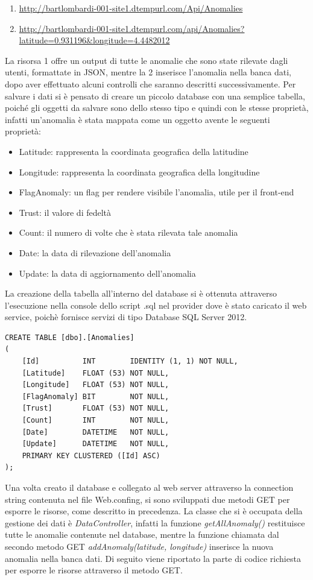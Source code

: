 \documentclass[a4paper, 11pt]{article} %
\begin{document}
\begin{enumerate}
	\item \url{http://bartlombardi-001-site1.dtempurl.com/Api/Anomalies}
	\item \url{http://bartlombardi-001-site1.dtempurl.com/api/Anomalies?latitude=0.931196\&longitude=4.4482012}
\end{enumerate}
La risorsa 1 offre un output di tutte le anomalie che sono state rilevate dagli utenti, formattate in JSON, mentre la 2 inserisce l'anomalia nella banca dati, dopo aver effettuato alcuni controlli che saranno descritti successivamente. Per salvare i dati si è pensato di creare un piccolo database con una semplice tabella, poiché gli oggetti da salvare sono dello stesso tipo e quindi con le stesse proprietà, infatti un’anomalia è stata mappata come un oggetto avente le seguenti proprietà:
\begin{itemize}
	\item Latitude: rappresenta la coordinata geografica della latitudine
	\item Longitude: rappresenta la coordinata geografica della longitudine
	\item FlagAnomaly: un flag per rendere visibile l'anomalia, utile per il front-end
	\item Trust: il valore di fedeltà
	\item Count: il numero di volte che è stata rilevata tale anomalia
	\item Date: la data di rilevazione dell'anomalia
	\item Update: la data di aggiornamento dell'anomalia
\end{itemize}
La creazione della tabella all'interno del database si è ottenuta attraverso l'esecuzione nella console dello script .sql nel provider dove è stato caricato il web service, poichè fornisce servizi di tipo Database SQL Server 2012.
\begin{verbatim}
CREATE TABLE [dbo].[Anomalies] 
(
    [Id]          INT        IDENTITY (1, 1) NOT NULL,
    [Latitude]    FLOAT (53) NOT NULL,
    [Longitude]   FLOAT (53) NOT NULL,
    [FlagAnomaly] BIT        NOT NULL,
    [Trust]       FLOAT (53) NOT NULL,
    [Count]       INT        NOT NULL,
    [Date]        DATETIME   NOT NULL,
    [Update]      DATETIME   NOT NULL,
    PRIMARY KEY CLUSTERED ([Id] ASC)
);
\end{verbatim}
Una volta creato il database e collegato al web server attraverso la connection string contenuta nel file Web.confing, si sono sviluppati due metodi GET per esporre le risorse, come descritto in precedenza. La classe che si è occupata della gestione dei dati è \textit{DataController}, infatti la funzione \textit{getAllAnomaly()} restituisce tutte le anomalie contenute nel database, mentre la funzione chiamata dal secondo metodo GET \textit{addAnomaly(latitude, longitude)} inserisce la nuova anomalia nella banca dati. Di seguito viene riportato la parte di codice richiesta per esporre le risorse attraverso il metodo GET.
\end{document}
